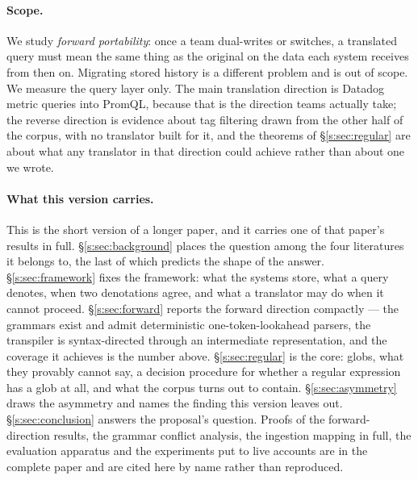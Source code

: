 \paragraph{Scope.}
We study \emph{forward portability}: once a team dual-writes or switches, a translated
query must mean the same thing as the original on the data each system receives from then
on. Migrating stored history is a different problem and is out of scope. We measure the
query layer only. The main translation direction is Datadog metric queries into PromQL,
because that is the direction teams actually take; the reverse direction is evidence
about tag filtering drawn from the other half of the corpus, with no translator built for
it, and the theorems of \S\ref{s:sec:regular} are about what any translator in that
direction could achieve rather than about one we wrote.

\paragraph{What this version carries.}
This is the short version of a longer paper, and it carries one of that paper's results
in full. \S\ref{s:sec:background} places the question among the four literatures it
belongs to, the last of which predicts the shape of the answer.
\S\ref{s:sec:framework} fixes the framework: what the systems store, what a
query denotes, when two denotations agree, and what a translator may do when it cannot
proceed. \S\ref{s:sec:forward} reports the forward direction compactly --- the grammars
exist and admit deterministic one-token-lookahead parsers, the transpiler is
syntax-directed through an intermediate representation, and the coverage it achieves is
the number above. \S\ref{s:sec:regular} is the core: globs, what they provably cannot
say, a decision procedure for whether a regular expression has a glob at all, and what
the corpus turns out to contain. \S\ref{s:sec:asymmetry} draws the asymmetry and names
the finding this version leaves out. \S\ref{s:sec:conclusion} answers the proposal's
question. Proofs of the forward-direction results, the grammar conflict analysis, the
ingestion mapping in full, the evaluation apparatus and the experiments put to live
accounts are in the complete paper and are cited here by name rather than reproduced.
